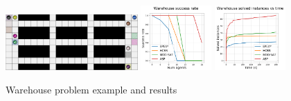 \begin{figure}
    \includegraphics[width=0.45\textwidth]{graphs/warehouse.PNG}
    \includegraphics[width=0.24\textwidth]{graphs/warehousesucc.png}
    \includegraphics[width=0.24\textwidth]{graphs/warehouseruntime.png}
    \caption{Warehouse problem example and results}
    \label{fig_ware}
\end{figure}

